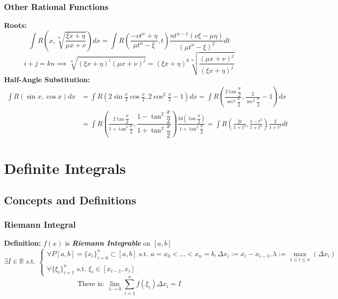 \documentclass{article}
\newcommand{\R}{\mathbb{R}}
\newcommand{\st}{\mbox{ s.t. }}
\newcommand{\0}{{\bf{0}}}
\begin{document}
\subsubsection{Other Rational Functions}
\textbf{Roots:}
$$\int R\left(x,{\sqrt[n]{\frac{\xi x+\eta}{\mu x+\nu}}}\right)dx=\int R\left(\frac{-\nu t^{n}+\eta}{\mu t^{n}-\xi},t\right)\frac{nt^{n-1}\left(\nu \xi-\mu \eta\right)}{\left(\mu t^{n}-\xi\right)^{2}}dt$$
$$i+j=kn\implies{\sqrt[n]{\left(\xi x+\eta\right)^{i}\left(\mu x+\nu\right)^{j}}}=\left(\xi x+\eta\right)^{k}{\sqrt[n]{\frac{\left(\mu x+\nu\right)^{j}}{\left(\xi x+\eta\right)^{j}}}}$$
\textbf{Half-Angle Substitution:}
\begin{equation}
\begin{split}
    \int R\left(\sin x,\cos x\right)dx&=\int R\left(2\sin\frac{x}{2}\cos\frac{x}{2},2\cos^{2}\frac{x}{2}-1\right)dx=\int R\left(\frac{2\tan\dfrac{x}{2}}{\sec^{2}\dfrac{x}{2}},\frac{2}{\sec^{2}\dfrac{x}{2}}-1\right)dx\\
    &=\int R\left(\frac{2\tan\dfrac{x}{2}}{1+\tan^{2}\dfrac{x}{2}},\dfrac{1-\tan^{2}\dfrac{x}{2}}{1+\tan^{2}\dfrac{x}{2}}\right)\frac{2d\left(\tan\dfrac{x}{2}\right)}{1+\tan^{2}\dfrac{x}{2}}=\int R\left(\frac{2t}{1+t^{2}},\frac{1-t^{2}}{1+t^{2}}\right)\frac{2}{1+t^{2}}dt
\end{split}
\end{equation}
\section{Definite Integrals}
\subsection{Concepts and Definitions}
\subsubsection{Riemann Integral}
\textbf{Definition:} $f(x)$ is \textit{\textbf{Riemann Integrable}} on $[a,b]$
$$\exists I\in\R\st\begin{cases}
    \forall P[a,b]=\{x_i\}_{i=0}^n\subset[a,b]\st a=x_0<\dots<x_n=b,\Delta x_{i}:=x_{i}-x_{i-1},\lambda:=\max\limits_{1\le i\le n}(\Delta x_{i})\\
    \forall\{\xi_{i}\}_{i=1}^n\st\xi_i\in\left[x_{i-1},x_{i}\right]
\end{cases}$$
$$\mbox{There is: }\lim_{\lambda\to 0}\sum_{i=1}^{n}f\left(\xi_{i}\right)\Delta x_{i}=I$$
\end{document}
